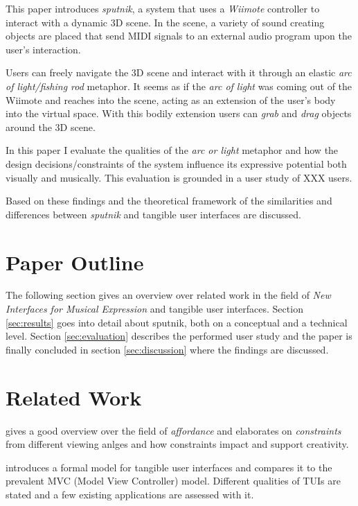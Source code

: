 \documentclass[10pt,a4paper]{scrartcl}
\begin{document}
This paper introduces \emph{sputnik}, a system that uses a \emph{Wiimote} controller to interact with a dynamic 3D scene. In the scene, a variety of sound creating objects are placed that send MIDI signals to an external audio program upon the user's interaction. 

Users can freely navigate the 3D scene and interact with it through an elastic \emph{arc of light/fishing rod} metaphor. It seems as if the \emph{arc of light} was coming out of the Wiimote and reaches into the scene, acting as an extension of the user's body into the virtual space. With this bodily extension users can \emph{grab} and \emph{drag} objects around the 3D scene.



In this paper I evaluate the qualities of the \emph{arc or light} metaphor and how the design decisions/constraints of the system influence its expressive potential both visually and musically. This evaluation is grounded in a user study of XXX users.

Based on these findings and the theoretical framework of \cite{Ullmer2000} the similarities and differences between \emph{sputnik} and tangible user interfaces are discussed. 


\section{Paper Outline}
The following section gives an overview over related work in the field of \emph{New Interfaces for Musical Expression} and tangible user interfaces. Section \ref{sec:results} goes into detail about sputnik, both on a conceptual and a technical level. Section \ref{sec:evaluation} describes the performed user study and the paper is finally concluded in section \ref{sec:discussion} where the findings are discussed.


\section{Related Work}
\cite{Magnusson2010} gives a good overview over the field of \emph{affordance} and elaborates on \emph{constraints} from different viewing anlges and how constraints impact and support creativity.

\cite{Ullmer2000} introduces a formal model for tangible user interfaces and compares it to the prevalent MVC (Model View Controller) model. Different qualities of TUIs are stated and a few existing applications are assessed with it.
\end{document}
